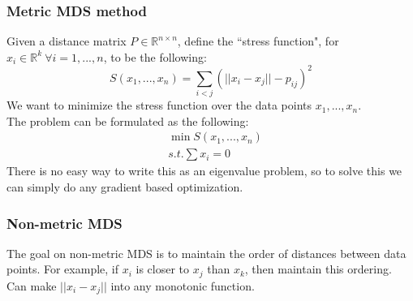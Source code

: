 \subsubsection{Metric MDS method}
Given a distance matrix $P \in \mathbb{R}^{n\times n}$, define the
``stress function", for $x_i \in \mathbb{R}^k \ \forall i=1,...,n$, to
be the following: 
\[
S(x_1,...,x_n) = \sum_{i<j}(||x_i-x_j||-p_{ij})^2
\]
We want to minimize the stress function over the data points $x_1,...,x_n$.\\
The problem can be formulated as the following:\\
\begin{align*}
&\min S(x_1,...,x_n)\\
&s.t. \sum x_i = 0
\end{align*}
There is no easy way to write this as an eigenvalue problem, so to
solve this we can simply do any gradient based optimization.\\ 

\subsubsection{Non-metric MDS}
The goal on non-metric MDS is to maintain the order of distances
between data points. For example, if $x_{i}$ is closer to $x_{j}$ than
$x_{k}$, then maintain this ordering. Can make $||x_{i} - x_{j}||$
into any monotonic function. 
